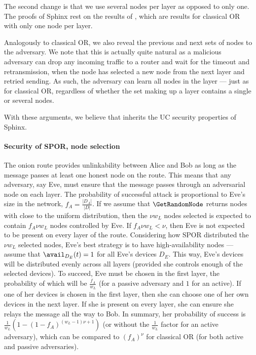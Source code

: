The second change is that we use several nodes per layer as opposed to only 
one.
The proofs of \ac{Sphinx} rest on the results of \textcite{CLOnionRouting}, which 
are results for classical \ac{OR} with only one node per layer.

Analogously to classical \ac{OR}, we also reveal the previous and next sets of 
nodes to the adversary. We note that this is actually quite natural as a 
malicious adversary can drop any incoming traffic to a router and wait for the 
timeout and
retransmission, \ie when the 
node has selected a new node from the next layer and retried sending.
As such, the adversary can learn all nodes in the layer --- just as for 
classical \ac{OR}, regardless of whether the set making up a layer contains a
single or several nodes.

With these arguments, we believe that \Sphinxes inherits the \ac{UC} security 
properties of \ac{Sphinx}. %

\paragraph*{Security of \acs*{SPOR}, node selection}

The onion route provides unlinkability between Alice and Bob as long as the 
message passes at least one honest node on the route.
This means that any adversary, say Eve,  must ensure that the message passes 
through an adversarial node on each layer.
The probability of successful attack is proportional to Eve's size in the 
network, \ie \(f_A = \frac{|D_A|}{|D|}\).
If we assume that \(\GetRandomNode\) returns nodes with close to the uniform 
distribution, then the \(\nu w_L\) nodes selected is expected to contain \(f_A 
  \nu w_L\) nodes controlled by Eve.
If \(f_A \nu w_L < \nu\), then Eve is not expected to be present on every layer 
of the route.
Considering how \ac{SPOR} distributed the \(\nu w_L\) selected nodes, Eve's 
best strategy is to have high-availability nodes --- assume that 
\(\avail_{D_E}(t) = 1\) for all Eve's devices \(D_E\).
This way, Eve's devices will be distributed evenly across all layers (provided 
she controls enough of the selected devices).
To succeed, Eve must be chosen in the first layer, the probability of which 
will be \(\frac{f_A}{w_L}\) (for a passive adversary and \(1\) for an active).
If one of her devices is chosen in the first layer, then she can choose one of 
her own devices in the next layer.
If she is present on every layer, she can ensure she relays the message all the 
way to Bob.
In summary, her probability of success is \(\frac{1}{w_L} (1-(1-f_A)^{(w_L-1) 
    \nu +1})\) (or without the \(\frac{1}{w_L}\) factor for an active 
adversary), which can be compared to \((f_A)^\nu\) for classical \ac{OR} (for 
both active and passive adversaries).


